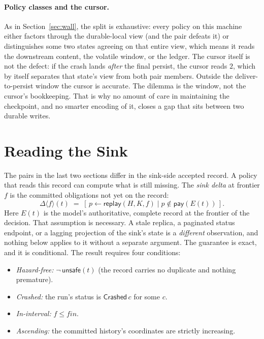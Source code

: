 \documentclass[sigplan,10pt]{acmart}
\theoremstyle{plain}
\theoremstyle{definition}
\newcommand{\replay}{\mathsf{replay}}      %
\newcommand{\scope}{K}                     %
\newcommand{\fin}{\mathit{fin}}            %
\newcommand{\pay}{\mathsf{pay}}            %
\newcommand{\unsafe}{\mathsf{unsafe}}
\newcommand{\Crashed}{\textsf{Crashed}}
\newcommand{\sdelta}{\Delta}               %
\begin{document}
\paragraph{Policy classes and the cursor.}
As in Section~\ref{sec:wall}, the split is exhaustive: every policy on
this machine either factors through the durable-local view (and the
pair defeats it) or distinguishes some two states agreeing on that
entire view, which means it reads the downstream content, the volatile
window, or the ledger. The cursor itself is not the defect: if the
crash lands \emph{after} the
final persist, the cursor reads $2$, which by itself separates that
state's view from both pair members. Outside the deliver-to-persist
window the cursor is accurate. The dilemma is the window, not the
cursor's bookkeeping. That is why no amount of care in maintaining the
checkpoint, and no smarter encoding of it, closes a gap that sits
between two durable writes.

\section{Reading the Sink}\label{sec:door}

The pairs in the last two sections differ in the sink-side accepted
record. A policy that reads this record can compute what is still
missing. The \emph{sink delta} at frontier
$f$ is the committed obligations not yet on the record:
\[
  \sdelta\langle f\rangle(t) \;=\;
  [\, p \leftarrow \replay(H,\scope,f) \mid p \notin \pay(E(t)) \,].
\]
Here $E(t)$ is the model's authoritative, complete record at the
frontier of the decision. That assumption is necessary. A
stale replica, a paginated status endpoint, or a lagging projection of
the sink's state is a \emph{different} observation, and nothing below
applies to it without a separate argument. The guarantee is exact, and
it is conditional. The result requires four conditions:
\begin{itemize}
\item[P1.] \emph{Hazard-free:} $\neg\,\unsafe(t)$ (the record carries
  no duplicate and nothing premature).
\item[P2.] \emph{Crashed:} the run's status is $\Crashed\,c$ for some
  $c$.
\item[P3.] \emph{In-interval:} $f \le \fin$.
\item[P4.] \emph{Ascending:} the committed history's coordinates are
  strictly increasing.
\end{itemize}
\end{document}
